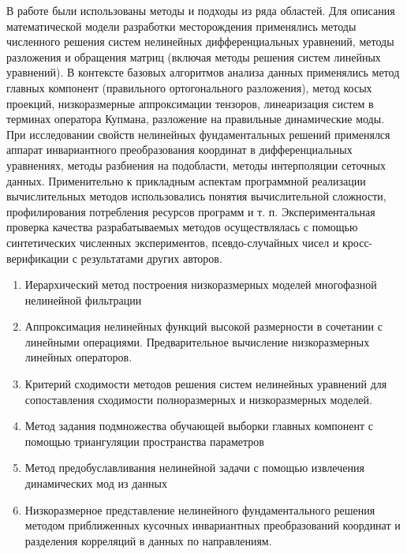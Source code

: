 {\methods}
В работе были использованы методы и подходы из ряда областей. Для описания математической модели разработки месторождения применялись методы численного решения систем нелинейных дифференциальных уравнений, методы разложения и обращения матриц (включая методы решения систем линейных уравнений). В контексте базовых алгоритмов анализа данных применялись метод главных компонент (правильного ортогонального разложения), метод косых проекций, низкоразмерные аппроксимации тензоров, линеаризация систем в терминах оператора Купмана, разложение на правильные динамические моды. При исследовании свойств нелинейных фундаментальных решений применялся аппарат инвариантного преобразования координат в дифференциальных уравнениях, методы разбиения на подобласти, методы интерполяции сеточных данных. Применительно к прикладным аспектам программной реализации вычислительных методов использовались понятия вычислительной сложности, профилирования потребления ресурсов программ и т. п. Экспериментальная проверка качества разрабатываемых методов осуществлялась с помощью синтетических численных экспериментов, псевдо-случайных чисел и кросс-верификации с результатами других авторов.

{}
\begin{enumerate}[beginpenalty=10000] %
  \item Иерархический метод построения низкоразмерных моделей многофазной нелинейной фильтрации
  \item Аппроксимация нелинейных функций высокой размерности в сочетании с линейными операциями. Предварительное вычисление низкоразмерных линейных операторов.
  \item Критерий сходимости методов решения систем нелинейных уравнений для сопоставления сходимости полноразмерных и низкоразмерных моделей.
  \item Метод задания подмножества обучающей выборки главных компонент с помощью триангуляции пространства параметров
  \item Метод предобуславливания нелинейной задачи с помощью извлечения динамических мод из данных
  \item Низкоразмерное представление нелинейного фундаментального решения методом приближенных кусочных инвариантных преобразований координат и разделения корреляций в данных по направлениям.
\end{enumerate}

